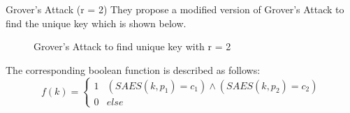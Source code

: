\begin{frame}{Grover's Attack (r = 2)}
They propose a modified version of Grover's Attack to find the unique key which is shown below.
    \begin{figure}[h!]
    
    
    \caption{Grover's Attack to find unique key with r = 2}
    \label{fig:grov18u}
\end{figure}
\pause
The corresponding boolean function is described as follows:
\begin{equation*}
 f(k) = 
 \begin{cases} 
      1 & (SAES(k, p_1) = c_1) \wedge (SAES(k, p_2) = c_2) \\
      0 & else 
  \end{cases}
\end{equation*}
\end{frame}